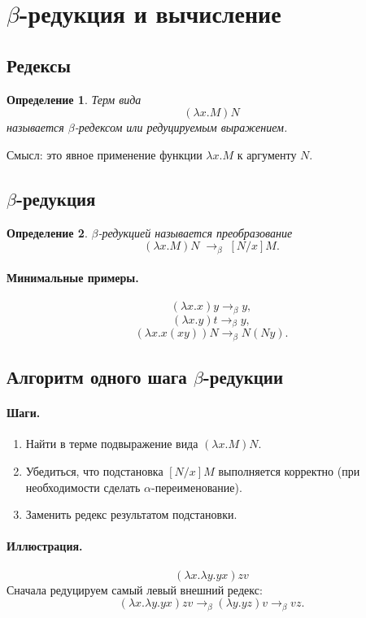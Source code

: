 \documentclass[12pt,a4paper]{article}
\newtheorem{definition}{Определение}
\theoremstyle{remark}
\begin{document}
\section{$\beta$-редукция и вычисление}

\subsection{Редексы}

\begin{definition}
Терм вида
\[
(\lambda x.M)N
\]
называется \emph{$\beta$-редексом} или \emph{редуцируемым выражением}.
\end{definition}

Смысл: это явное применение функции $\lambda x.M$ к аргументу $N$.

\subsection{$\beta$-редукция}

\begin{definition}
\emph{$\beta$-редукцией} называется преобразование
\[
(\lambda x.M)N \;\to_\beta\; [N/x]M.
\]
\end{definition}

\paragraph{Минимальные примеры.}
\[
(\lambda x.x)y \to_\beta y,
\]
\[
(\lambda x.y)t \to_\beta y,
\]
\[
(\lambda x.x(xy))N \to_\beta N(Ny).
\]

\subsection{Алгоритм одного шага $\beta$-редукции}

\paragraph{Шаги.}
\begin{enumerate}
    \item Найти в терме подвыражение вида $(\lambda x.M)N$.
    \item Убедиться, что подстановка $[N/x]M$ выполняется корректно (при необходимости сделать $\alpha$-переименование).
    \item Заменить редекс результатом подстановки.
\end{enumerate}

\paragraph{Иллюстрация.}
\[
(\lambda x.\lambda y.yx)zv
\]
Сначала редуцируем самый левый внешний редекс:
\[
(\lambda x.\lambda y.yx)zv \to_\beta (\lambda y.yz)v \to_\beta vz.
\]
\end{document}
